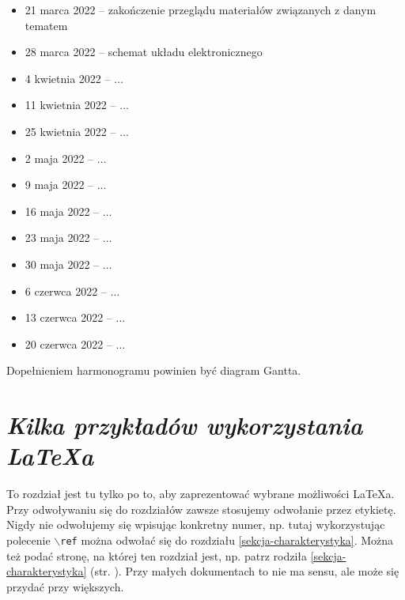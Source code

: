 \documentclass[12pt,a4paper,polish]{article}
\begin{document}
  \begin{itemize}
    \item 21 marca 2022  -- zakończenie przeglądu materiałów
                            związanych z danym tematem
    \item 28 marca 2022 -- schemat układu elektronicznego
    \item  4 kwietnia 2022 -- $\ldots$
    \item 11 kwietnia 2022 -- $\ldots$
    \item 25 kwietnia 2022 -- $\ldots$
    \item  2 maja 2022 -- $\ldots$
    \item  9 maja 2022 -- $\ldots$
    \item 16 maja 2022 -- $\ldots$
    \item 23 maja 2022 -- $\ldots$
    \item 30 maja 2022 -- $\ldots$
    \item  6 czerwca 2022 -- $\ldots$
    \item 13 czerwca 2022 -- $\ldots$
    \item 20 czerwca 2022 -- $\ldots$
  \end{itemize}
  Dopełnieniem harmonogramu powinien być diagram Gantta.




\section{{\it Kilka przykładów wykorzystania \LaTeX a} }

 To rozdział jest tu tylko po to, aby zaprezentować wybrane
 możliwości \LaTeX a.
 Przy odwoływaniu się do rozdziałów zawsze stosujemy odwołanie
 przez etykietę. Nigdy nie odwołujemy się wpisując konkretny
 numer, np. tutaj wykorzystując polecenie {\tt $\backslash$ref}
 można odwołać się do rozdziału \ref{sekcja-charakterystyka}.
 Można też podać stronę, na której ten rozdział jest, 
 np. patrz rodziła  \ref{sekcja-charakterystyka} 
(str.  \pageref{sekcja-charakterystyka}).
 Przy małych dokumentach to nie ma sensu, ale może się przydać
 przy większych.
\end{document}
